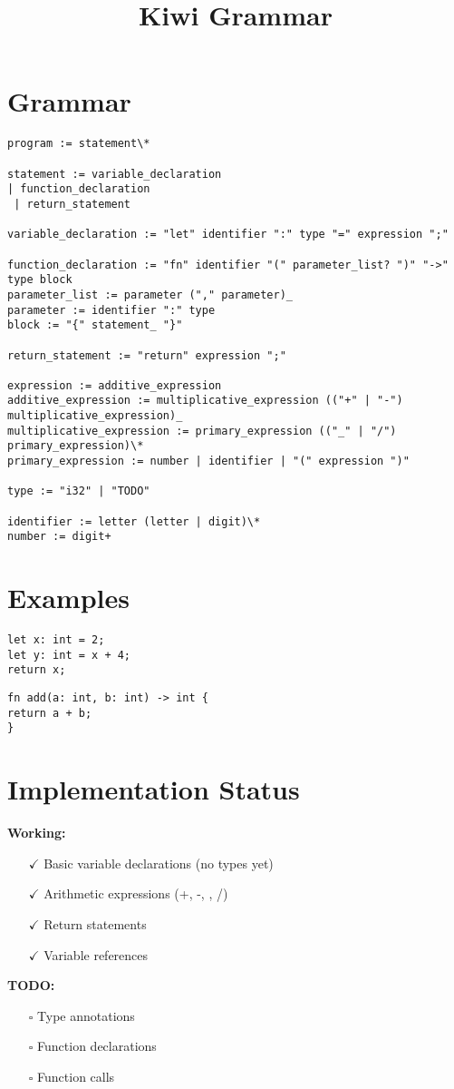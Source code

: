 \documentclass[11pt]{article}
\title{Kiwi Grammar}
\date{}
\begin{document}
\maketitle

\section{Grammar}

\begin{verbatim}
program := statement\*

statement := variable_declaration
| function_declaration
 | return_statement

variable_declaration := "let" identifier ":" type "=" expression ";"

function_declaration := "fn" identifier "(" parameter_list? ")" "->" type block
parameter_list := parameter ("," parameter)_
parameter := identifier ":" type
block := "{" statement_ "}"

return_statement := "return" expression ";"

expression := additive_expression
additive_expression := multiplicative_expression (("+" | "-") multiplicative_expression)_
multiplicative_expression := primary_expression (("_" | "/") primary_expression)\*
primary_expression := number | identifier | "(" expression ")"

type := "i32" | "TODO"

identifier := letter (letter | digit)\*
number := digit+
\end{verbatim}

\section{Examples}

\begin{lstlisting}[language=Kiwi]
let x: int = 2;
let y: int = x + 4;
return x;
\end{lstlisting}

\begin{lstlisting}[language=Kiwi]
fn add(a: int, b: int) -> int {
return a + b;
}
\end{lstlisting}

\section{Implementation Status}

\textbf{Working:}

\begin{itemize}
\item[$\checkmark$] Basic variable declarations (no types yet)
\item[$\checkmark$] Arithmetic expressions (+, -, \*, /)
\item[$\checkmark$] Return statements
\item[$\checkmark$] Variable references
\end{itemize}

\textbf{TODO:}

\begin{itemize}
\item[$\square$] Type annotations
\item[$\square$] Function declarations
\item[$\square$] Function calls
\end{itemize}
\end{document}
